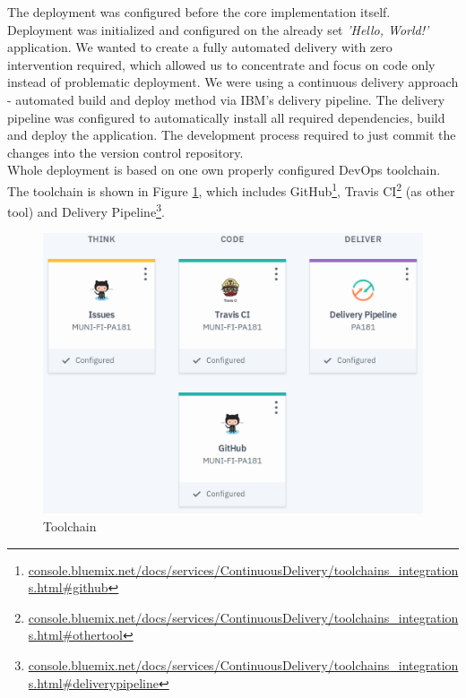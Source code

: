\documentclass[11pt,a4paper]{article}
\begin{document}
The deployment was configured before the core implementation itself. Deployment was initialized and configured on the already set \textit{'Hello, World!'} application. We wanted to create a fully automated delivery with zero intervention required, which allowed us to concentrate and focus on code only instead of problematic deployment. We were using a continuous delivery approach - automated build and deploy method via IBM's delivery pipeline. The delivery pipeline was configured to automatically install all required dependencies, build and deploy the application. The development process required to just commit the changes into the version control repository.\\

Whole deployment is based on one own properly configured DevOps toolchain. The toolchain is shown in Figure \ref{fig:toolchain}, which includes GitHub\footnote{\href{https://console.bluemix.net/docs/services/ContinuousDelivery/toolchains\_integrations.html\#github}{console.bluemix.net/docs/services/ContinuousDelivery/toolchains\_integrations.html\#github}}, Travis CI\footnote{\href{https://console.bluemix.net/docs/services/ContinuousDelivery/toolchains\_integrations.html\#othertool}{console.bluemix.net/docs/services/ContinuousDelivery/toolchains\_integrations.html\#othertool}} (as other tool) and Delivery Pipeline\footnote{\href{https://console.bluemix.net/docs/services/ContinuousDelivery/toolchains\_integrations.html\#deliverypipeline}{console.bluemix.net/docs/services/ContinuousDelivery/toolchains\_integrations.html\#deliverypipeline}}.

\begin{figure}[H]
    \centering
    \includegraphics[scale=0.3]{img/toolchain.png}
    \caption{Toolchain}
    \label{fig:toolchain}
\end{figure}
\end{document}
